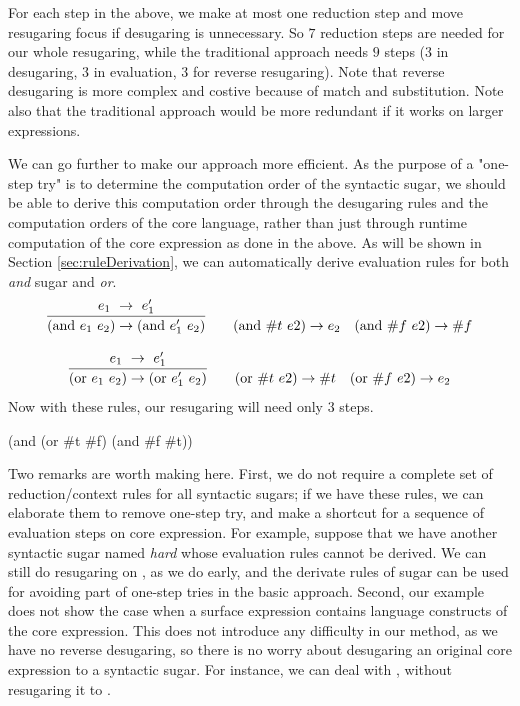 For each step in the above, we make at most one reduction step and move resugaring focus if desugaring is unnecessary. So $7$ reduction steps are needed for our whole resugaring, while the traditional approach needs $9$ steps ($3$ in desugaring, $3$ in evaluation, $3$ for reverse resugaring). Note that reverse desugaring is more complex and costive because of match and substitution. Note also that the traditional approach would be more redundant if it works on larger expressions.

We can go further to make our approach more efficient. As the purpose of a "one-step try" is to determine the computation order of the syntactic sugar, we should be able to derive this computation order through the desugaring rules and the computation orders of the core language, rather than just through runtime computation of the core expression as done in the above. As will be shown in Section \ref{sec:ruleDerivation}, we can automatically derive evaluation rules  for both \emph{and} sugar and \emph{or}.
\[
\begin{array}{c}
\infer {(\mbox{and}~e_1~e_2) \rightarrow (\mbox{and}~e_1'~e_2)} {e_1~ \rightarrow~e_1'}
\qquad
(\mbox{and}~\#t~e2) \rightarrow e_2
\quad
(\mbox{and}~\#f~e2) \rightarrow \#f \\
\\
\infer {(\mbox{or}~e_1~e_2) \rightarrow (\mbox{or}~e_1'~e_2)} {e_1~ \rightarrow~e_1'}
\qquad
(\mbox{or}~\#t~e2) \rightarrow \#t
\quad
(\mbox{or}~\#f~e2) \rightarrow e_2 \\
\end{array}
\]
Now with these rules, our resugaring will need only $3$ steps.
\begin{Codes}
    (and (or \#t \#f) (and \#f \#t))
\end{Codes}

Two remarks are worth making here. First, we do not require a complete set of reduction/context rules for all syntactic sugars; if we have these rules, we can elaborate them to remove one-step try, and make a shortcut for a sequence of evaluation steps on core expression.
For example, suppose that we have another syntactic sugar named \emph{hard} whose evaluation rules cannot be derived.
We can still do resugaring on , as we do early, and the derivate rules of  sugar can be used for avoiding part of one-step tries in the basic approach.
Second, our example does not show the case when a surface expression contains language constructs of the core expression. This does not introduce any difficulty in our method, as we have no reverse desugaring, so there is no worry about desugaring an original core expression to a syntactic sugar. For instance, we can deal with , without resugaring it to .


